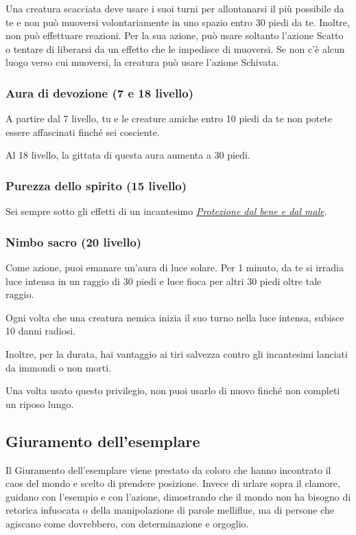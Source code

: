 \documentclass[a4paper,10pt,twoside,twocolumn,openany,bg=full,nodeprecatedcode]{dndbook}
\begin{document}
Una creatura scacciata deve usare i suoi turni per allontanarsi il più possibile da te e non può muoversi volontariamente in uno spazio entro 30 piedi da te. Inoltre, non può effettuare reazioni. Per la sua azione, può usare soltanto l'azione Scatto o tentare di liberarsi da un effetto che le impedisce di muoversi. Se non c'è alcun luogo verso cui muoversi, la creatura può usare l'azione Schivata.

\subsubsection{Aura di devozione (7\degree{} e 18\degree{} livello)}\label{aura_di_devozione_7_e_18_livello}
A partire dal 7\degree{} livello, tu e le creature amiche entro 10 piedi da te non potete essere affascinati finché sei cosciente.

Al 18\degree{} livello, la gittata di questa aura aumenta a 30 piedi.

\subsubsection{Purezza dello spirito (15\degree{} livello)}\label{purezza_dello_spirito_15_livello}
Sei sempre sotto gli effetti di un incantesimo \emph{\hyperref[Protection_from_Evil_and_Good_protection_from_evil_and_good]{Protezione dal bene e dal male}}.

\subsubsection{Nimbo sacro (20\degree{} livello)}\label{nimbo_sacro_20_livello}
Come azione, puoi emanare un'aura di luce solare. Per 1 minuto, da te si irradia luce intensa in un raggio di 30 piedi e luce fioca per altri 30 piedi oltre tale raggio.

Ogni volta che una creatura nemica inizia il suo turno nella luce intensa, subisce 10 danni radiosi.

Inoltre, per la durata, hai vantaggio ai tiri salvezza contro gli incantesimi lanciati da immondi o non morti.

Una volta usato questo privilegio, non puoi usarlo di nuovo finché non completi un riposo lungo.

\subsection{Giuramento dell'esemplare}\label{giuramento_dellesemplare}
Il Giuramento dell'esemplare viene prestato da coloro che hanno incontrato il caos del mondo e scelto di prendere posizione. Invece di urlare sopra il clamore, guidano con l'esempio e con l'azione, dimostrando che il mondo non ha bisogno di retorica infuocata o della manipolazione di parole melliflue, ma di persone che agiscano come dovrebbero, con determinazione e orgoglio.
\end{document}
